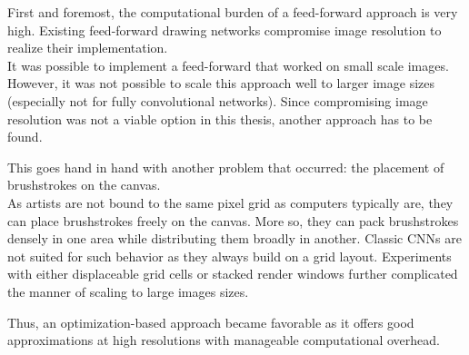 First and foremost, the computational burden of a feed-forward approach is very high.
Existing feed-forward drawing networks compromise image resolution to realize their implementation.\\
It was possible to implement a feed-forward that worked on small scale images. 
However, it was not possible to scale this approach well to larger image sizes (especially not for fully convolutional networks).
Since compromising image resolution was not a viable option in this thesis, another approach has to be found.

This goes hand in hand with another problem that occurred: the placement of brushstrokes on the canvas.\\
As artists are not bound to the same pixel grid as computers typically are, they can place brushstrokes freely on the canvas.
More so, they can pack brushstrokes densely in one area while distributing them broadly in another.
Classic CNNs are not suited for such behavior as they always build on a grid layout.
Experiments with either displaceable grid cells or stacked render windows further complicated the manner of scaling to large images sizes.

Thus, an optimization-based approach became favorable as it offers good approximations at high resolutions with manageable computational overhead.


